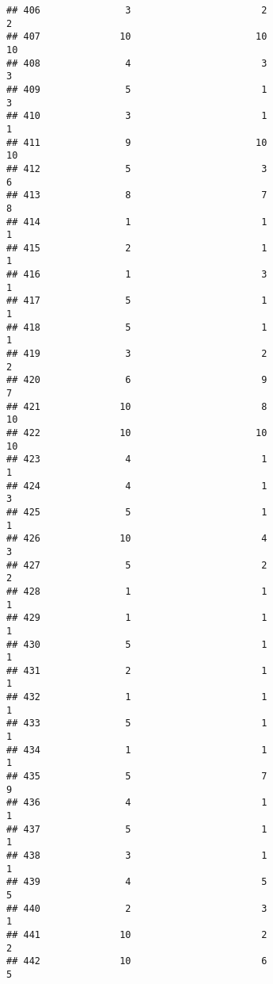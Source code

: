 \documentclass[
]{article}
\begin{document}
\begin{verbatim}
## 406               3                       2                        2
## 407              10                      10                       10
## 408               4                       3                        3
## 409               5                       1                        3
## 410               3                       1                        1
## 411               9                      10                       10
## 412               5                       3                        6
## 413               8                       7                        8
## 414               1                       1                        1
## 415               2                       1                        1
## 416               1                       3                        1
## 417               5                       1                        1
## 418               5                       1                        1
## 419               3                       2                        2
## 420               6                       9                        7
## 421              10                       8                       10
## 422              10                      10                       10
## 423               4                       1                        1
## 424               4                       1                        3
## 425               5                       1                        1
## 426              10                       4                        3
## 427               5                       2                        2
## 428               1                       1                        1
## 429               1                       1                        1
## 430               5                       1                        1
## 431               2                       1                        1
## 432               1                       1                        1
## 433               5                       1                        1
## 434               1                       1                        1
## 435               5                       7                        9
## 436               4                       1                        1
## 437               5                       1                        1
## 438               3                       1                        1
## 439               4                       5                        5
## 440               2                       3                        1
## 441              10                       2                        2
## 442              10                       6                        5

\end{verbatim}
\end{document}
